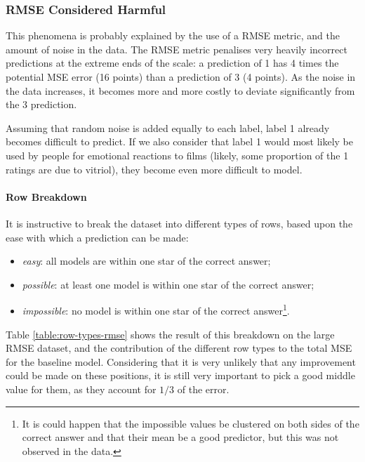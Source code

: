 \documentclass{article}
\begin{document}
\subsubsection{RMSE Considered Harmful}

This phenomena is probably explained by the use of a RMSE metric, and the amount of noise in the data.  The RMSE metric penalises very heavily incorrect predictions at the extreme ends of the scale: a prediction of 1 has 4 times the potential MSE error (16 points) than a prediction of 3 (4 points).  As the noise in the data increases, it becomes more and more costly to deviate significantly from the 3 prediction.

Assuming that random noise is added equally to each label, label 1 already becomes difficult to predict.  If we also consider that label 1 would most likely be used by people for emotional reactions to films (likely, some proportion of the 1 ratings are due to vitriol), they become even more difficult to model.

\paragraph{Row Breakdown}
It is instructive to break the dataset into different types of rows, based upon the ease with which a prediction can be made:
\begin{itemize}
\item \emph{easy}: all models are within one star of the correct answer;
\item \emph{possible}: at least one model is within one star of the correct answer;
\item \emph{impossible}: no model is within one star of the correct answer\footnote{It is could happen that the impossible values be clustered on both sides of the correct answer and that their mean be a good predictor, but this was not observed in the data.}.
\end{itemize}

Table \ref{table:row-types-rmse} shows the result of this breakdown on the large RMSE dataset, and the contribution of the different row types to the total MSE for the baseline model.  Considering that it is very unlikely that any improvement could be made on these positions, it is still very important to pick a good middle value for them, as they account for $1/3$ of the error. 
\end{document}
